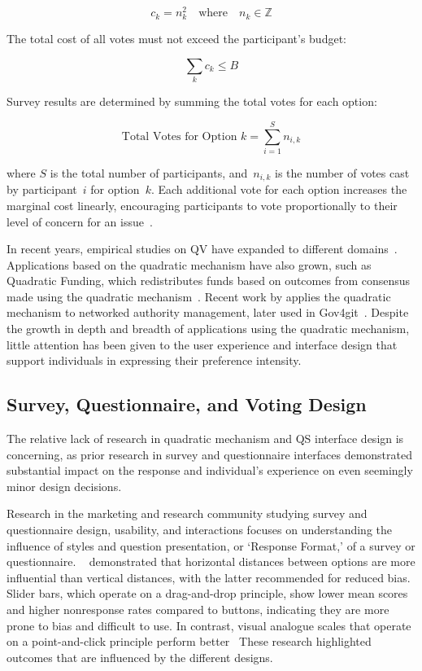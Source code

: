\[c_k = n_k^2 \quad \text{where}\quad n_k \in \mathbb{Z}\]

The total cost of all votes must not exceed the participant's budget:

\[\sum_k c_k \leq B\]

Survey results are determined by summing the total votes for each option:

\[ \text{Total Votes for Option } k = \sum_{i=1}^{S} n_{i,k} \]

where $S$ is the total number of participants, and~$n_{i,k}$ is the number of votes cast by participant~$i$ for option~$k$. Each additional vote for each option increases the marginal cost linearly, encouraging participants to vote proportionally to their level of concern for an issue~\cite{posner2018radical}.

In recent years, empirical studies on QV have expanded to different domains~\cite{naylor2017first, cavailleWhoCaresMeasuring}. Applications based on the quadratic mechanism have also grown, such as Quadratic Funding, which redistributes funds based on outcomes from consensus made using the quadratic mechanism~\cite{buterinFlexibleDesignFunding2019a, freitasQuadraticFundingIncomplete2024}. Recent work by \textcite{southPluralManagement2024} applies the quadratic mechanism to networked authority management, later used in Gov4git~\cite{Gov4gitDecentralizedPlatform2023}. Despite the growth in depth and breadth of applications using the quadratic mechanism, little attention has been given to the user experience and interface design that support individuals in expressing their preference intensity.

\subsection{Survey, Questionnaire, and Voting Design}
The relative lack of research in quadratic mechanism and QS interface design is concerning, as prior research in survey and questionnaire interfaces demonstrated substantial impact on the response and individual's experience on even seemingly minor design decisions. 

Research in the marketing and research community studying survey and questionnaire design, usability, and interactions focuses on understanding the influence of styles and question presentation, or `Response Format,' of a survey or questionnaire. ~\textcite{weijtersExtremityHorizontalVertical2021} demonstrated that horizontal distances between options are more influential than vertical distances, with the latter recommended for reduced bias. Slider bars, which operate on a drag-and-drop principle, show lower mean scores and higher nonresponse rates compared to buttons, indicating they are more prone to bias and difficult to use. In contrast, visual analogue scales that operate on a point-and-click principle perform better~\cite{toepoelSlidersVisualAnalogue2018} These research highlighted outcomes that are influenced by the different designs.

